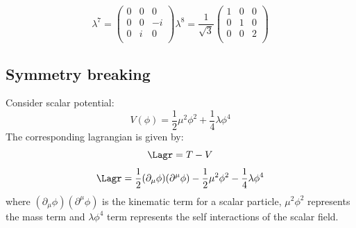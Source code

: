\begin{equation*}
	\lambda^{7} = 
\begin{pmatrix} 
	0 	& 	0	&	0 \\
	0 	& 	0	&	-i \\
	0 	& 	i	&	0 \\
\end{pmatrix}
	\lambda^{8} = \frac{1}{\sqrt{3}}
\begin{pmatrix} 
	1 	& 	0	&	0 \\
	0 	& 	1	&	0 \\
	0 	& 	0	&	2 \\
\end{pmatrix}
\end{equation*}


\subsection{Symmetry breaking} %
\label{sub:symmetry_breaking}
Consider scalar potential:
\begin{equation*}
	V(\phi) = \frac{1}{2}\mu^{2}\phi^{2} + \frac{1}{4}\lambda\phi^{4}
\end{equation*}
The corresponding lagrangian is given by:
\begin{equation*}
	\Lagr = T - V
\end{equation*}
\begin{equation*}
	\Lagr = \frac{1}{2}(\partial_{\mu}\phi)(\partial^{\mu}\phi) - \frac{1}{2}\mu^{2}\phi^{2} - \frac{1}{4}\lambda\phi^{4}
\end{equation*}
where $(\partial_{\mu}\phi)(\partial^{\mu}\phi)$ is the kinematic term for a scalar particle, $\mu^{2}\phi^{2}$ represents the mass term and $\lambda\phi^{4}$ term represents the self interactions of the scalar field.

